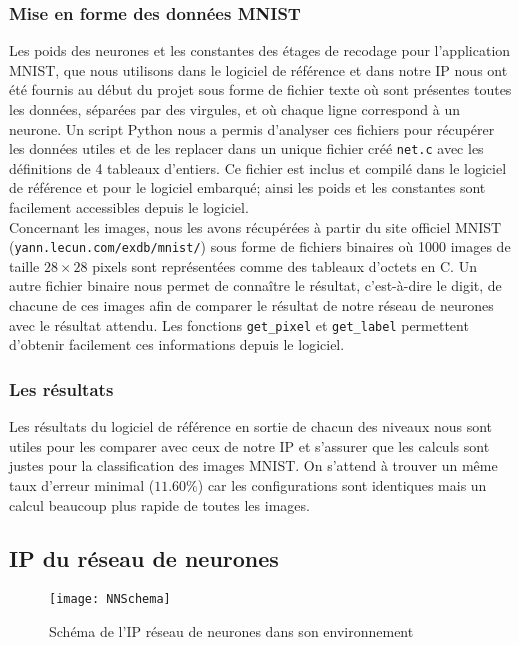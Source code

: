 \subsubsection{Mise en forme des données MNIST}

Les poids des neurones et les constantes des étages de recodage
pour l'application MNIST, que nous utilisons dans
le logiciel de référence et dans notre IP nous ont été fournis au début du projet
sous forme de fichier texte où sont présentes toutes les données, séparées par
des virgules, et où chaque ligne correspond à un neurone. Un script Python nous
a permis d'analyser ces fichiers pour récupérer les données utiles et de les
replacer dans un unique fichier créé \texttt{net.c} avec les définitions de
4 tableaux d'entiers. Ce fichier est inclus et compilé dans le logiciel de référence et
pour le logiciel embarqué; ainsi les poids et les constantes sont
facilement accessibles depuis le logiciel. \\
Concernant les images, nous les avons récupérées à partir du site
officiel MNIST \linebreak (\texttt{yann.lecun.com/exdb/mnist/}) sous forme de fichiers
binaires où 1000 images de taille $28 \times 28$ pixels sont représentées comme
des tableaux d'octets en C. Un autre fichier binaire nous permet de connaître
le résultat, c'est-à-dire le digit, de chacune de ces images afin de comparer le
résultat de notre réseau de neurones avec le résultat attendu.
Les fonctions \texttt{get\_pixel} et \texttt{get\_label} permettent d'obtenir
facilement ces informations depuis le logiciel.

\subsubsection{Les résultats}

Les résultats du logiciel de référence en sortie de chacun des niveaux nous
sont utiles pour les comparer avec ceux de notre IP et s'assurer que les calculs
sont justes pour la classification des images MNIST. On s'attend à trouver
un même taux d'erreur minimal ($11.60\%$) car les configurations sont identiques
mais un calcul beaucoup plus rapide de toutes les images.

\subsection{IP du réseau de neurones}

\begin{figure}[h!]
	\begin{center}
		\texttt{[image: NNSchema]}
		\label{fig:NNSchema}
		\caption{Schéma de l'IP réseau de neurones dans son environnement }
	\end{center}
\end{figure}

